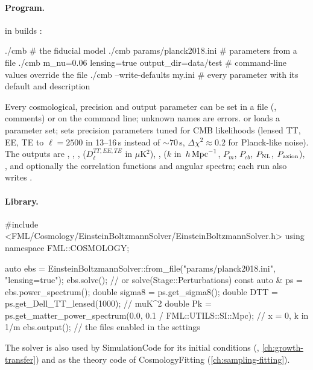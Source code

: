 \paragraph*{Program.}  in  builds :
\begin{paramfile}
./cmb                                              # the fiducial model
./cmb params/planck2018.ini                        # parameters from a file
./cmb m_nu=0.06 lensing=true output_dir=data/test  # command-line values override the file
./cmb --write-defaults my.ini                      # every parameter with its default and description
\end{paramfile}
Every cosmological, precision and output parameter can be set in a file (, \code{\#} comments) or
on the command line; unknown names are errors.   or  loads a
parameter set;   sets precision parameters tuned for CMB likelihoods (lensed TT, EE, TE to
$\ell=2500$ in 13--16\,s instead of $\sim70$\,s, $\Delta\chi^2\approx0.2$ for Planck-like noise). The outputs are
, , ,  ($D_\ell^{TT,EE,TE}$
in $\mu$K$^2$), ,  ($k$ in $\,h\,\mathrm{Mpc}^{-1}$, $P_m$, $P_{cb}$, $P_{\rm NL}$,
$P_{\rm axion}$), , and optionally the correlation functions and angular spectra; each run also
writes .

\paragraph*{Library.}
\begin{cppcode}
#include <FML/Cosmology/EinsteinBoltzmannSolver/EinsteinBoltzmannSolver.h>
using namespace FML::COSMOLOGY;

auto ebs = EinsteinBoltzmannSolver::from_file("params/planck2018.ini", {"lensing=true"});
ebs.solve();                                      // or solve(Stage::Perturbations)
const auto & ps = ebs.power_spectrum();
double sigma8 = ps.get_sigma8();
double DTT    = ps.get_Dell_TT_lensed(1000);      // muK^2
double Pk     = ps.get_matter_power_spectrum(0.0, 0.1 / FML::UTILS::SI::Mpc);  // x = 0, k in 1/m
ebs.output();                                     // the files enabled in the settings
\end{cppcode}
The solver is also used by SimulationCode for its initial conditions (,
\cref{ch:growth-transfer}) and as the theory code of CosmologyFitting (\cref{ch:sampling-fitting}).


